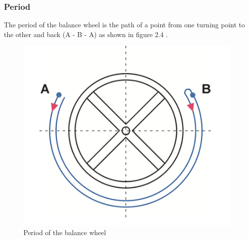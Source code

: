 \documentclass[12pt, a4paper]{report}
\begin{document}
\subsubsection{Period}
The period of the balance wheel is the path of a point from one turning point to the other and back (A - B - A) as shown in figure 2.4 \cite{Witschi_basics}.
    \begin{figure}[H]
    \centering
    \includegraphics[scale=0.4]{Images/period.png}
    
    \caption{Period of the balance wheel \cite{Witschi_basics}}
    \end{figure}
\bigskip
\end{document}

